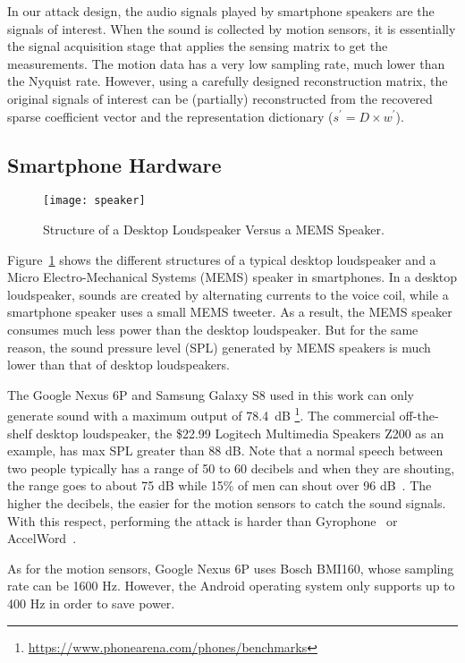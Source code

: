 In our attack design, the audio signals played by smartphone speakers are the signals of interest. When the sound is collected by motion sensors, it is essentially the signal acquisition stage that applies the sensing matrix to get the measurements. The motion data has a very low sampling rate, much lower than the Nyquist rate. However, using a carefully designed reconstruction matrix, the original signals of interest can be (partially) reconstructed from the recovered sparse coefficient vector and the representation dictionary ($s^\prime = D \times w^\prime$).

\subsection{Smartphone Hardware}


\begin{figure}[!h]
	\centering
	\hspace{.25in}
	\texttt{[image: speaker]}
	\caption{Structure of a Desktop Loudspeaker Versus a MEMS Speaker.}
	\label{fig:speaker}
\end{figure}

Figure~\ref{fig:speaker} shows the different structures of a typical desktop loudspeaker and a Micro Electro-Mechanical Systems (MEMS) speaker in smartphones. In a desktop loudspeaker, sounds are created by alternating currents to the voice coil, while a smartphone speaker uses a small MEMS tweeter. As a result, the MEMS speaker consumes much less power than the desktop loudspeaker. But for the same reason, the sound pressure level (SPL) generated by MEMS speakers is much lower than that of desktop loudspeakers.



The Google Nexus 6P and Samsung Galaxy S8 used in this work can only generate sound with a maximum output of 78.4~dB
\footnote{\scriptsize \url{https://www.phonearena.com/phones/benchmarks}}. 
The commercial off-the-shelf desktop loudspeaker, the \$22.99 Logitech Multimedia Speakers Z200 as an example, has max SPL greater than 88 dB. 
%
Note that a normal speech between two people typically has a range of 50 to 60 decibels and when they are shouting, the range goes to about 75 dB while 15\% of men can shout over 96 dB~\cite{online2005Voice}.
%
The higher the decibels, the easier for the motion sensors to catch the sound signals. With this respect, performing the {\attackName} attack is harder than Gyrophone~\cite{michalevsky2014gyrophone} or AccelWord~\cite{zhang2015accelword}.

As for the motion sensors, Google Nexus 6P uses Bosch BMI160, whose sampling rate can be 1600 Hz. However, the Android operating system only supports up to 400 Hz in order to save power.





